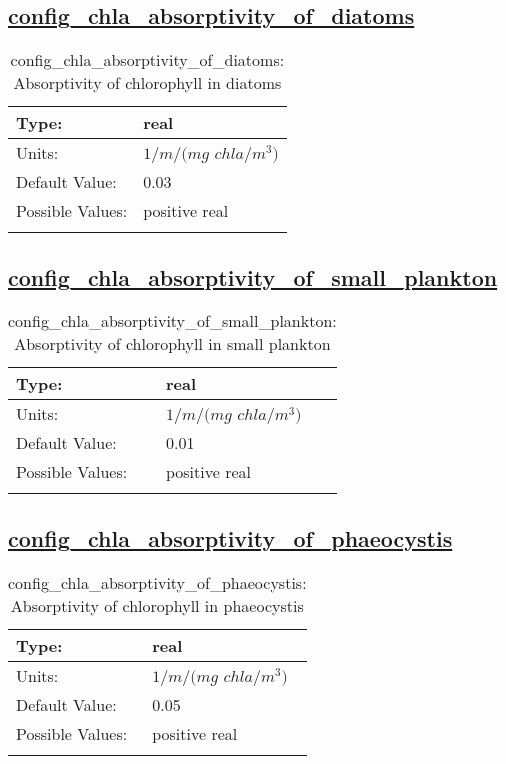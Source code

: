 \subsection[config\_chla\_absorptivity\_of\_diatoms]{\hyperref[sec:nm_tab_biogeochemistry]{config\_chla\_absorptivity\_of\_diatoms}}
\label{subsec:nm_sec_config_chla_absorptivity_of_diatoms}
\begin{center}
\begin{longtable}{| p{2.0in} || p{4.0in} |}
    \hline
    Type: & real \\
    \hline
    Units: & $1/m/(mg$ $chla/m^3)$ \\
    \hline
    Default Value: & 0.03 \\
    \hline
    Possible Values: & positive real \\
    \hline
    \caption{config\_chla\_absorptivity\_of\_diatoms: Absorptivity of chlorophyll in diatoms}
\end{longtable}
\end{center}
\subsection[config\_chla\_absorptivity\_of\_small\_plankton]{\hyperref[sec:nm_tab_biogeochemistry]{config\_chla\_absorptivity\_of\_small\_plankton}}
\label{subsec:nm_sec_config_chla_absorptivity_of_small_plankton}
\begin{center}
\begin{longtable}{| p{2.0in} || p{4.0in} |}
    \hline
    Type: & real \\
    \hline
    Units: & $1/m/(mg$ $chla/m^3)$ \\
    \hline
    Default Value: & 0.01 \\
    \hline
    Possible Values: & positive real \\
    \hline
    \caption{config\_chla\_absorptivity\_of\_small\_plankton: Absorptivity of chlorophyll in small plankton}
\end{longtable}
\end{center}
\subsection[config\_chla\_absorptivity\_of\_phaeocystis]{\hyperref[sec:nm_tab_biogeochemistry]{config\_chla\_absorptivity\_of\_phaeocystis}}
\label{subsec:nm_sec_config_chla_absorptivity_of_phaeocystis}
\begin{center}
\begin{longtable}{| p{2.0in} || p{4.0in} |}
    \hline
    Type: & real \\
    \hline
    Units: & $1/m/(mg$ $chla/m^3)$ \\
    \hline
    Default Value: & 0.05 \\
    \hline
    Possible Values: & positive real \\
    \hline
    \caption{config\_chla\_absorptivity\_of\_phaeocystis: Absorptivity of chlorophyll in phaeocystis}
\end{longtable}
\end{center}
